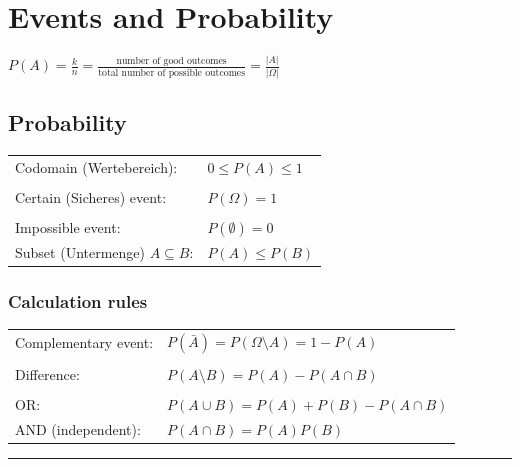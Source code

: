 
\section{Events and Probability}
$P(A)=\frac{k}{n}=\frac{\text{number of good outcomes}}{\text{total number of possible outcomes}}=\frac{|A|}{|\Omega|}$\\

\vspace{5mm}
 
	\begin{minipage}{8cm}
	\subsection{Probability }
		\begin{tabular}{ll}
			Codomain (Wertebereich):
			& ${0}\le{P(A)}\le{1}$\\ \\
			Certain (Sicheres) event:
			& $P(\Omega)=1$\\ \\
			Impossible event:
			& $P(\emptyset)=0$\\
			Subset (Untermenge) $A\subseteq B$: & $P(A)\leq P(B)$
		\end{tabular}
	\end{minipage}
		\begin{minipage}{11.2cm}
		\subsubsection{Calculation rules}
			\begin{tabular}{ll}
				Complementary event: &$P(\bar{A})=P({\Omega}\setminus{A})=1-P(A)$\\ \\
				Difference: &$P({A}\setminus{B})=P(A)-P({A}\cap{B})$\\ \\
				OR: &$P({A}\cup{B})=P(A)+P(B)-P({A}\cap{B})$\\
				AND (independent): & $P(A\cap B)=P(A)P(B)$
				
			\end{tabular}
		\end{minipage}
		\newline
		
\vspace{2mm}
\hrule

\vspace{3mm}


